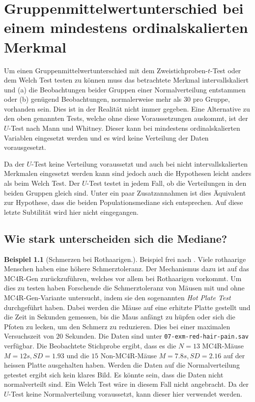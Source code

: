 \documentclass[
]{book}
\theoremstyle{definition}
\theoremstyle{definition}
\newtheorem{example}{Beispiel}[chapter]
\theoremstyle{definition}
\theoremstyle{definition}
\theoremstyle{remark}
\begin{document}
\chapter{Gruppenmittelwertunterschied bei einem mindestens ordinalskalierten Merkmal}\label{gruppenmittelwertunterschied-bei-einem-mindestens-ordinalskalierten-merkmal}

Um einen Gruppenmittelwertunterschied mit dem Zweistichproben-\(t\)-Test
oder dem Welch Test testen zu können muss das betrachtete Merkmal
intervallskaliert und (a) die Beobachtungen beider Gruppen einer
Normalverteilung entstammen oder (b) genügend Beobachtungen,
normalerweise mehr als \(30\) pro Gruppe, vorhanden sein. Dies ist in der
Realität nicht immer gegeben. Eine Alternative zu den oben genannten
Tests, welche ohne diese Voraussetzungen auskommt, ist der \(U\)-Test nach
Mann und Whitney. Dieser kann bei mindestens ordinalskalierten Variablen
eingesetzt werden und es wird keine Verteilung der Daten vorausgesetzt.

Da der \(U\)-Test keine Verteilung voraussetzt und auch bei nicht
intervallskalierten Merkmalen eingesetzt werden kann sind jedoch auch
die Hypothesen leicht anders als beim Welch Test. Der \(U\)-Test testet in
jedem Fall, ob die Verteilungen in den beiden Gruppen gleich sind. Unter
ein paar Zusatzannahmen ist dies Äquivalent zur Hypothese, dass die
beiden Populationsmediane sich entsprechen. Auf diese letzte Subtilität
wird hier nicht eingegangen.

\section{Wie stark unterscheiden sich die Mediane?}\label{wie-stark-unterscheiden-sich-die-mediane}

\begin{example}[Schmerzen bei Rothaarigen.]
\protect\hypertarget{exm:red-hair-pain}{}\label{exm:red-hair-pain}Beispiel frei nach \citet{robinson2021}. Viele rothaarige Menschen haben eine
höhere Schmerztoleranz. Der Mechanismus dazu ist auf das MC4R-Gen
zurückzuführen, welches vor allem bei Rothaarigen vorkommt. Um dies zu
testen haben Forschende die Schmerztoleranz von Mäusen mit und ohne
MC4R-Gen-Variante untersucht, indem sie den sogenannten \emph{Hot Plate Test}
durchgeführt haben. Dabei werden die Mäuse auf eine erhitzte Platte
gestellt und die Zeit in Sekunden gemessen, bis die Maus anfängt zu
hüpfen oder sich die Pfoten zu lecken, um den Schmerz zu reduzieren.
Dies bei einer maximalen Versuchszeit von \(20\) Sekunden. Die Daten sind
unter \texttt{07-exm-red-hair-pain.sav} verfügbar. Die
Beobachtete Stichprobe ergibt, dass es die \(N = 13\) MC4R-Mäuse
\(M = 12s, SD = 1.93\) und die \(15\) Non-MC4R-Mäuse \(M = 7.8s, SD = 2.16\)
auf der heissen Platte ausgehalten haben. Werden die Daten auf die
Normalverteilung getestet ergibt sich kein klares Bild. Es könnte sein,
dass die Daten nicht normalverteilt sind. Ein Welch Test wäre in diesem
Fall nicht angebracht. Da der \(U\)-Test keine Normalverteilung
voraussetzt, kann dieser hier verwendet werden.
\end{example}
\end{document}
